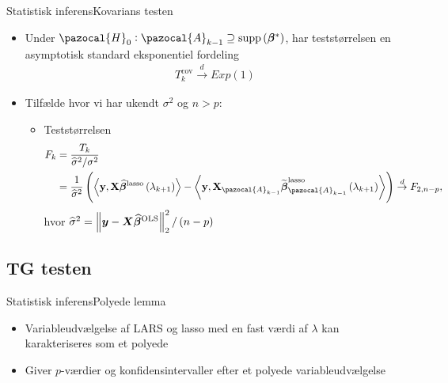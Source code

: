 \begin{frame}{Statistisk inferens}{Kovarians testen}
\begin{itemize}
\item Under $\pazocal{H}_0 : \pazocal{A}_{k-1} \supseteq \text{supp} \del{\boldsymbol\beta^*} $, har teststørrelsen en asymptotisk standard eksponentiel fordeling 
\begin{align*}
T_k^{\text{cov}} \overset{d}{\rightarrow} Exp(1)
\end{align*}
\item Tilfælde hvor vi har ukendt $\sigma^2$ og $n>p$: 
\begin{itemize}
\item Teststørrelsen
\begin{align*}
F_k & = \frac{T_k}{\widehat\sigma^2 /\sigma^2} \\
& = \frac{1}{\widehat\sigma^2}\del{ \left\langle \textbf{y}, \textbf{X} \widehat{\boldsymbol{\beta}}^\text{lasso} \del{\lambda_{k+1}} \right\rangle -  \left\langle  \textbf{y}, \textbf{X}_{\pazocal{A}_{k-1}}\widetilde{ \boldsymbol{{\beta}}}^\text{lasso}_{\pazocal{A}_{k-1}} \del{\lambda_{k+1}} \right\rangle} \overset{d}{\rightarrow} F_{2,n-p},
\end{align*}
hvor $\widehat{\sigma}^2 = \left\Vert \vy - \vX \boldsymbol{\widehat{\beta}}^\text{OLS} \right\Vert^2_2  / \del{n-p}$
\end{itemize}
\end{itemize}
\end{frame}

\subsection{TG testen}
\begin{frame}{Statistisk inferens}{Polyede lemma}
\begin{itemize}
\item Variableudvælgelse af LARS og lasso med en fast værdi af $\lambda$ kan karakteriseres som et polyede
\item Giver $p$-værdier og konfidensintervaller efter et polyede variableudvælgelse
\end{itemize}
\end{frame}

